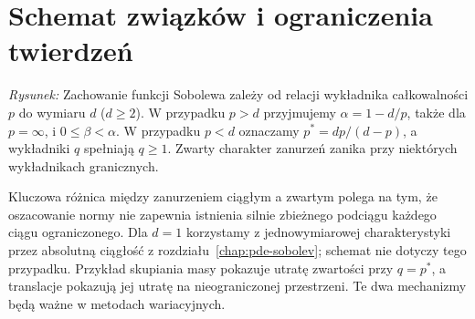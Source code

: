 \section{Schemat związków i ograniczenia twierdzeń}
\label{sec:pde10-summary}
\begin{center}

{\small\emph{Rysunek:} Zachowanie funkcji Sobolewa zależy od relacji
wykładnika całkowalności $p$ do wymiaru $d$ ($d\ge2$).
W przypadku $p>d$ przyjmujemy $\alpha=1-d/p$,
także dla $p=\infty$, i $0\le\beta<\alpha$.
W przypadku $p<d$ oznaczamy $p^*=dp/(d-p)$,
a wykładniki $q$ spełniają $q\ge1$.
Zwarty charakter zanurzeń zanika przy niektórych
wykładnikach granicznych.}
\end{center}

Kluczowa różnica między zanurzeniem ciągłym a zwartym
polega na tym, że oszacowanie normy nie zapewnia istnienia
silnie zbieżnego podciągu każdego ciągu ograniczonego.
Dla $d=1$ korzystamy z jednowymiarowej charakterystyki
przez absolutną ciągłość z rozdziału~\ref{chap:pde-sobolev};
schemat nie dotyczy tego przypadku. Przykład skupiania masy
pokazuje utratę zwartości przy $q=p^*$, a translacje
pokazują jej utratę na nieograniczonej przestrzeni.
Te dwa mechanizmy będą ważne w metodach wariacyjnych.


